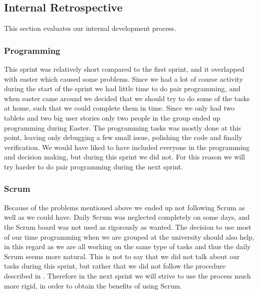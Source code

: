 \subsection{Internal Retrospective}\label{internal2}
This section evaluates our internal development process.

\subsubsection{Programming}
This sprint was relatively short compared to the first sprint, and it overlapped with easter which caused some problems.
Since we had a lot of course activity during the start of the sprint we had little time to do pair programming, and when easter came around we decided that we should try to do some of the tasks at home, such that we could complete them in time.
Since we only had two tablets and two big user stories only two people in the group ended up programming during Easter.
The programming tasks was mostly done at this point, leaving only debugging a few small issue, polishing the code and finally verification.
We would have liked to have included everyone in the programming and decision making, but during this sprint we did not.
For this reason we will try harder to do pair programming during the next sprint.

\subsubsection{Scrum}
Because of the problems mentioned above we ended up not following Scrum as well as we could have.
Daily Scrum was neglected completely on some days, and the Scrum board was not used as rigorously as wanted.
The decision to use most of our time programming when we are grouped at the university should also help, in this regard as we are all working on the same type of tasks and thus the daily Scrum seems more natural.
This is not to say that we did not talk about our tasks during this sprint, but rather that we did not follow the procedure described in .
Therefore in the next sprint we will strive to use the process much more rigid, in order to obtain the benefits of using Scrum.
